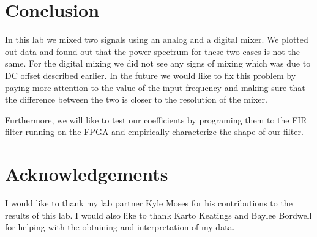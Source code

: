 \documentclass[12pt]{article}
\begin{document}
 

\section {Conclusion}
In this lab we mixed two signals using an analog and a digital mixer. We
plotted out data and found out that the power spectrum for these two
cases is not the same. For the digital mixing we did not see any signs
of mixing which was due to DC offset described earlier. In the future we
would like to fix this problem by paying more attention to the value of
the input frequency and making sure that the difference between the two
is closer to the resolution of the mixer. 

Furthermore, we will like to test our coefficients by programing them to
the FIR filter running on the FPGA and empirically characterize the
shape of our filter. 

\section {Acknowledgements}
I would like to thank my lab partner Kyle Moses for his contributions to
the results of this lab. I would also like to thank Karto Keatings and
Baylee Bordwell for helping with the obtaining and interpretation of my data.
\end{document}
